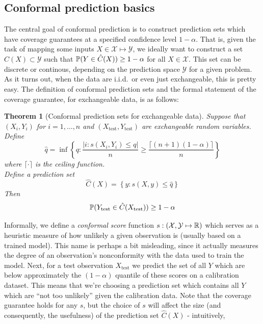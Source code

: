 \documentclass[a4paper, 12pt]{article}
\newtheorem{theorem}{Theorem}
\begin{document}
\subsection{Conformal prediction basics}
\label{sec:basics}
The central goal of conformal prediction is to construct prediction sets which have coverage guarantees at
a specified confidence level $1-\alpha$. That is, given the task of mapping some inputs
$X \in \mathcal{X} \mapsto \mathcal{Y}$, we ideally want to construct a set $\hat{C}(X) \subset \mathcal{Y}$ such that
$\P(Y \in \hat{C}(X)) \geq 1 - \alpha$ for all $X \in \mathcal{X}$. This set can be discrete or continous, depending on the prediction space $\mathcal{Y}$ for a given problem. As it turns out,
when the data are i.i.d.\ or even just exchangeable, this is pretty easy. The definition of conformal prediction sets and the formal statement of the coverage
guarantee, for exchangeable data, is as follows:
\begin{theorem}[Conformal prediction sets for exchangeable data]
    Suppose that $(X_i, Y_i)$ for $i = 1, \ldots, n$ and $(X_{\text{test}}, Y_{\text{test}})$ are exchangeable random variables. \\
    Define
    \[
        \hat{q} = \inf \left\{ q: \frac{\left| i : s(X_i, Y_i) \leq q \right|}{n} \geq \frac{\lceil (n+1)(1-\alpha) \rceil }{n} \right\}
    \]
    where $\lceil \cdot \rceil$ is the ceiling function.\\
    Define a prediction set
    \[
        \hat{C}(X) = \left\{ y: s(X, y) \leq \hat{q} \right\}
    \]
    Then \[ \P (Y_{\text{test}} \in \hat{C}(X_{\text{test}})) \geq 1 - \alpha \]
    \label{thm:exchangeable_conformal_prediction}
\end{theorem}
Informally, we define a \textit{conformal score} function $s : (\mathcal{X}, \mathcal{Y} \mapsto \R) $ which serves as a heuristic measure of how unlikely a given observation is (usually based on a trained model). This name is perhaps a bit misleading, since it actually measures the degree of an observation's nonconformity with the data used to train the model.
Next, for a test observation $X_{\text{test}}$ we predict the set of all $Y$ which are below approximately the $(1-\alpha)$ quantile of these scores on a calibration dataset.
This means that we're choosing a prediction set which contains all $Y$ which are ``not too unlikely'' given the calibration data.
Note that the coverage guarantee holds for any $s$, but the choice of $s$ will affect the size (and consequently, the usefulness) of the prediction set $\hat{C}(X)$ - intuitively,
\end{document}
